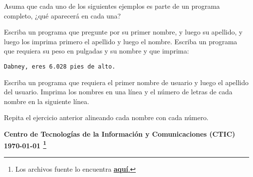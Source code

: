 \documentclass[spanish,addpoints,answers,a4paper]{exam}
\newcommand{\unmarkedfntext}[1]{%
	\begingroup
	\renewcommand\thefootnote{}\footnote{#1}%
	\addtocounter{footnote}{-1}%
	\endgroup
}
\begin{document}
\begin{questions}
\question Asuma que cada uno de los siguientes ejemplos es parte de un programa completo, ¿qué aparecerá en cada una?
\question Escriba un programa que pregunte por su primer nombre, y luego su apellido, y luego los imprima primero el apellido y luego el nombre.
\question Escriba un programa que requiera su peso en pulgadas y su nombre y que imprima:
\begin{verbatim}
Dabney, eres 6.028 pies de alto.
\end{verbatim}

\question Escriba un programa que requiera el primer nombre de usuario y luego el apellido del usuario. Imprima los nombres en una línea y el número de letras de cada nombre en la siguiente línea.

\question Repita el ejercicio anterior alineando cada nombre con cada número.

\end{questions}
\begin{flushright}\bfseries
Centro de Tecnologías de la Información y Comunicaciones (CTIC)\\[2mm]
\today\unmarkedfntext{Los archivos fuente lo encuentra  \href{https://github.com/carlosal1015/C-Programming}{\textbf{aquí}.}}
\end{flushright}
\end{document}
